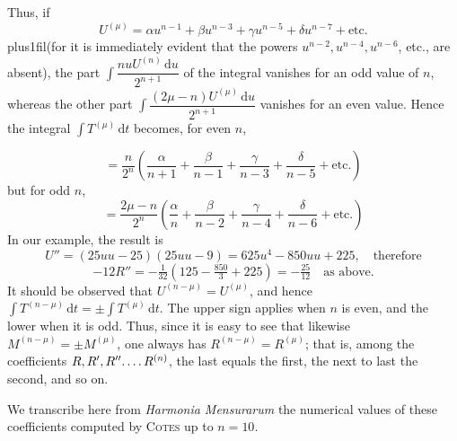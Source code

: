 Thus, if
\[
U^{(\mu)}=\alpha u^{n-1}+\beta u^{n-3}+\gamma u^{n-5}+\delta u^{n-7}+\text{etc.}
\]
\begingroup\rightskip=0pt plus1fil\relax\noindent (for it is immediately evident that the powers $u^{n-2},\allowbreak u^{n-4},\allowbreak u^{n-6}$, etc., are absent), the part $\int\dfrac{nuU^{(n)}\,\mathrm{d}u}{2^{n+1}}$ of the integral vanishes for an odd value of $n$, whereas the other part $\int\dfrac{(2\mu-n)U^{(\mu)}\,\mathrm{d}u}{2^{n+1}}$ vanishes for an even value. Hence the integral $\int T^{(\mu)}\,\mathrm{d}t$ becomes, for even $n$,\par\endgroup
\[
=\frac{n}{2^n}\left(\frac{\alpha}{n+1}+\frac{\beta}{n-1}+\frac{\gamma}{n-3}+\frac{\delta}{n-5}+\text{etc.}\right)
\]
but for odd $n$,
\[
=\frac{2\mu-n}{2^n}\left(\frac{\alpha}{n}+\frac{\beta}{n-2}+\frac{\gamma}{n-4}+\frac{\delta}{n-6}+\text{etc.}\right)
\]
In our example, the result is
\[
U''=(25uu-25)(25uu-9)=625u^4-850uu+225,\quad\text{therefore}
\]
\[
-12R''=-\tfrac1{32}\left(125-\tfrac{850}{3}+225\right)=-\tfrac{25}{12}\quad\text{as above.}
\]
It should be observed that $U^{(n-\mu)}=U^{(\mu)}$, and hence $\int T^{(n-\mu)}\,\mathrm{d}t=\pm\int T^{(\mu)}\,\mathrm{d}t$. The upper sign applies when $n$ is even, and the lower when it is odd. Thus, since it is easy to see that likewise $M^{(n-\mu)}=\pm M^{(\mu)}$, one always has $R^{(n-\mu)}=R^{(\mu)}$; that is, among the coefficients $R,R',R''\ldotp\ldotp\ldotp\ldotp R^{(n)}$, the last equals the first, the next to last the second, and so on.

We transcribe here from \textit{Harmonia Mensurarum} the numerical values of these coefficients computed by \textsc{Cotes} up to $n=10$.

